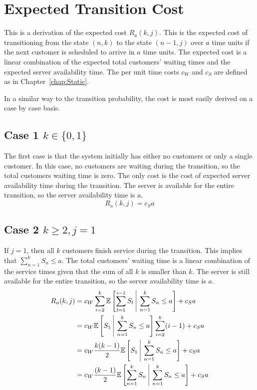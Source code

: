 \section{Expected Transition Cost}
This is a derivation of the expected cost $R_{a} (k, j)$. This is the expected cost of transitioning from the state $(n, k)$ to the state $(n - 1, j)$ over $a$ time units if the next customer is scheduled to arrive in $a$ time units. The expected cost is a linear combination of the expected total customers' waiting times and the expected server availability time. The per unit time costs $c_{W}$ and $c_{S}$ are defined as in Chapter~\ref{chap:Static}.

In a similar way to the transition probability, the cost is most easily derived on a case by case basis.

\subsection{Case 1 $k \in \{ 0, 1 \}$}
The first case is that the system initially has either no customers or only a single customer. In this case, no customers are waiting during the transition, so the total customers waiting time is zero. The only cost is the cost of expected server availability time during the transition. The server is available for the entire transition, so the server availability time is $a$.
\begin{equation}
	R_{a} (k, j) = c_{S} a
\end{equation}

\subsection{Case 2 $k \geq 2, j = 1$}
If $j = 1$, then all $k$ customers finish service during the transition. This implies that $\displaystyle \sum_{n = 1}^{k} S_{n} \leq a$. The total customers' waiting time is a linear combination of the service times given that the sum of all $k$ is smaller than $k$. The server is still available for the entire transition, so the server availability time is $a$.
\begin{equation}
	\begin{split}
		R_{a} (k, j) & = c_{W} \sum_{i = 2}^{k} \mathbb{E} \left[ \sum_{l = 1}^{i - 1} S_{l} \ \vline \ \sum_{n = 1}^{k} S_{n} \leq a \right] + c_{S} a \\
		& = c_{W} \mathbb{E} \left[ S_{1} \ \vline \ \sum_{n = 1}^{k} S_{n} \leq a \right] \sum_{i = 2}^{k} (i - 1) + c_{S} a \\
		& = c_{W} \frac{k (k - 1)}{2} \mathbb{E} \left[ S_{1} \ \vline \ \sum_{n = 1}^{k} S_{n} \leq a \right] + c_{S} a \\
		& = c_{W} \frac{(k - 1)}{2} \mathbb{E} \left[ \sum_{n = 1}^{k} S_{n} \ \vline \ \sum_{n = 1}^{k} S_{n} \leq a \right] + c_{S} a \\
	\end{split}
\end{equation}

